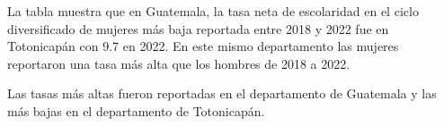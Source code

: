 \justifying La tabla muestra que en Guatemala, la tasa neta de escolaridad en el ciclo diversificado de mujeres más baja reportada entre 2018 y 2022 fue en Totonicapán con 9.7 en 2022. En este mismo departamento las mujeres reportaron una tasa más alta que los hombres de 2018 a 2022. 

Las tasas más altas fueron reportadas en el departamento de Guatemala y las más bajas en el departamento de Totonicapán.